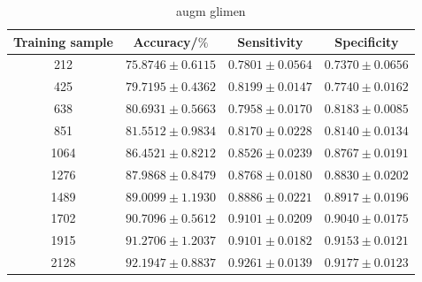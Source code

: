 \begin{table}[H]
    \centering
        \begin{tabular}{cccc}
            \toprule
            Training sample & Accuracy/$\%$ & Sensitivity & Specificity\\
            \midrule
            212  & $75.8746 \pm 0.6115$ & $0.7801 \pm 0.0564$ & $0.7370 \pm 0.0656$ \\
            425  & $79.7195 \pm 0.4362$ & $0.8199 \pm 0.0147$ & $0.7740 \pm 0.0162$ \\
            638  & $80.6931 \pm 0.5663$ & $0.7958 \pm 0.0170$ & $0.8183 \pm 0.0085$ \\
            851  & $81.5512 \pm 0.9834$ & $0.8170 \pm 0.0228$ & $0.8140 \pm 0.0134$ \\
            1064 & $86.4521 \pm 0.8212$ & $0.8526 \pm 0.0239$ & $0.8767 \pm 0.0191$ \\
            1276 & $87.9868 \pm 0.8479$ & $0.8768 \pm 0.0180$ & $0.8830 \pm 0.0202$ \\
            1489 & $89.0099 \pm 1.1930$ & $0.8886 \pm 0.0221$ & $0.8917 \pm 0.0196$ \\
            1702 & $90.7096 \pm 0.5612$ & $0.9101 \pm 0.0209$ & $0.9040 \pm 0.0175$ \\
            1915 & $91.2706 \pm 1.2037$ & $0.9101 \pm 0.0182$ & $0.9153 \pm 0.0121$ \\
            2128 & $92.1947 \pm 0.8837$ & $0.9261 \pm 0.0139$ & $0.9177 \pm 0.0123$ \\         
            \bottomrule
        \end{tabular}
  \caption{augm glimen}
  \label{tab:}
\end{table}


